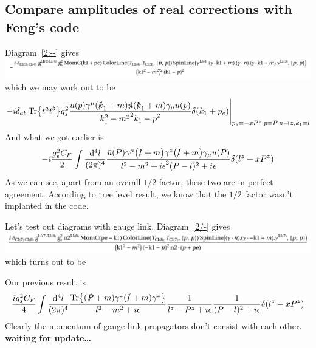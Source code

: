 \documentclass{article}
\DeclarePairedDelimiter\bracketM{[}{]}
\let\bqty\relax
\newcommand{\bqty}[1]{\bracketM*{#1}}
\newcommand{\red}[1]{{\color{red}#1}}
\newcommand{\mm}[1]{\frac{\dd^4#1}{(2\pi)^4}}
\begin{document}
\subsection{Compare amplitudes of real corrections with Feng's code}
Diagram~\ref{2:--} gives \\
\includegraphics[width=\linewidth]{image2.png}\\
which we may work out to be 
\begin{align}
	\eval{-i\delta_{ab}\Tr{t^at^b}g_s^2\frac{\bar u(p)\gamma^{\mu}(\slashed{k}_1+m)\slashed n(\slashed{k}_1+m)\gamma_{\mu} u(p)}{\bqty{k_1^2-m^2}^2\bqty{k_1-p}^2}\delta(k_1+p_e)}_{p_e=-x P^z,p=P,n\to z,k_1=l}
\end{align}
And what we got earlier is
\begin{align}
	-i\frac{g_s^2C_F}{2}\int\mm{l} \frac{\bar u(P) \gamma^\mu\pqty{\slashed l+m}\gamma^z\pqty{\slashed l+m}\gamma_{\mu} u(P)}{\bqty{l^2-m^2+i\epsilon}^2\bqty{(P-l)^2+i\epsilon}}\delta(l^z-xP^z)
\end{align}
As we can see, apart from an overall $1/2$ factor, these two are in perfect agreement. According to tree level result, we know that the $1/2$ factor wasn't implanted in the code. 

Let's test out diagrams with gauge link. Diagram~\ref{2/-} gives\\
\includegraphics[width=\linewidth]{image4.png}
\\which turns out to be 

Our previous result is 
\begin{align}
	\frac{ig_s^2C_F}{4}\int\mm{l}  \frac{\Tr{(\slashed P+m)\gamma^z(\slashed l+m)\gamma^z}}{l^2-m^2+i\epsilon}\frac{1}{l^z-P^z+i\epsilon}\frac{1}{(P-l)^2+i\epsilon} \delta(l^z-xP^z)
\end{align}
Clearly the momentum of gauge link propagators don't consist with each other. \red{\bf{waiting for update\dots}}
\end{document}
